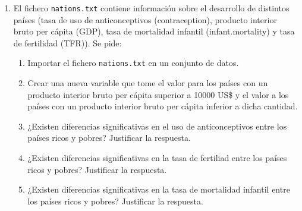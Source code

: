 \begin{enumerate}[leftmargin=*]
\item El fichero \texttt{nations.txt} contiene información sobre el desarrollo de distintos países (tasa de uso de
anticonceptivos (contraception), producto interior bruto per cápita (GDP), tasa de mortalidad infantil
(infant.mortality) y tasa de fertilidad (TFR)). Se pide:
\begin{enumerate}
\item Importar el fichero \texttt{nations.txt} en un conjunto de datos.
\item Crear una nueva variable  que tome el valor  para los países con un producto interior bruto
per cápita superior a 10000 US\$ y el valor  a los países con un producto interior bruto per cápita inferior a dicha
cantidad.
\item ¿Existen diferencias significativas en el uso de anticonceptivos entre los países ricos y pobres? Justificar la respuesta.
\item ¿Existen diferencias significativas en la tasa de fertiliad entre los países ricos y pobres? Justificar la respuesta.
\item ¿Existen diferencias significativas en la tasa de mortalidad infantil entre los países ricos y pobres? Justificar la respuesta.
\end{enumerate}
\end{enumerate}
